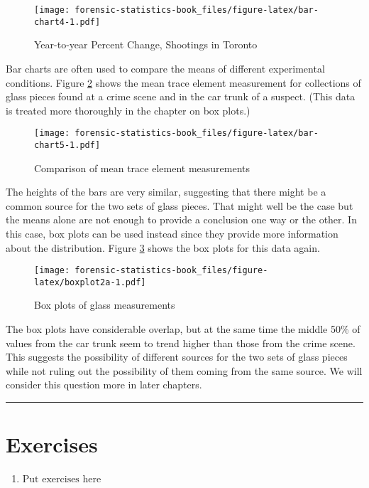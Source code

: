 \documentclass[
]{book}
\providecommand{\tightlist}{%
  \setlength{\itemsep}{0pt}\setlength{\parskip}{0pt}}
\begin{document}
\begin{figure}
\centering
\texttt{[image: forensic-statistics-book\_files/figure-latex/bar-chart4-1.pdf]}
\caption{\label{fig:bar-chart4}Year-to-year Percent Change, Shootings in Toronto}
\end{figure}

Bar charts are often used to compare the means of different experimental
conditions. Figure \ref{fig:bar-chart5} shows the mean trace element
measurement for collections of glass pieces found at a crime scene and
in the car trunk of a suspect. (This data is treated more thoroughly
in the chapter on box plots.)

\begin{figure}
\centering
\texttt{[image: forensic-statistics-book\_files/figure-latex/bar-chart5-1.pdf]}
\caption{\label{fig:bar-chart5}Comparison of mean trace element measurements}
\end{figure}

The heights of the bars are very similar, suggesting that there might be
a common source for the two sets of glass pieces. That might well be the
case but the means alone are not enough to provide a conclusion one way or
the other. In this case, box plots can be used instead since they provide
more information about the distribution. Figure \ref{fig:boxplot2a}
shows the box plots for this data again.

\begin{figure}
\centering
\texttt{[image: forensic-statistics-book\_files/figure-latex/boxplot2a-1.pdf]}
\caption{\label{fig:boxplot2a}Box plots of glass measurements}
\end{figure}

The box plots have considerable overlap, but at the same time the middle 50\%
of values from the car trunk seem to trend higher than those from the crime
scene. This suggests the possibility of different sources for the two sets
of glass pieces while not ruling out the possibility of them coming from the
same source. We will consider this question more in later chapters.

\begin{center}\rule{0.5\linewidth}{0.5pt}\end{center}

\hypertarget{exercises-5}{%
\section{Exercises}\label{exercises-5}}

\begin{enumerate}
\def\labelenumi{\arabic{enumi}.}
\tightlist
\item
  \(\text{Put exercises here}\)
\end{enumerate}
\end{document}
